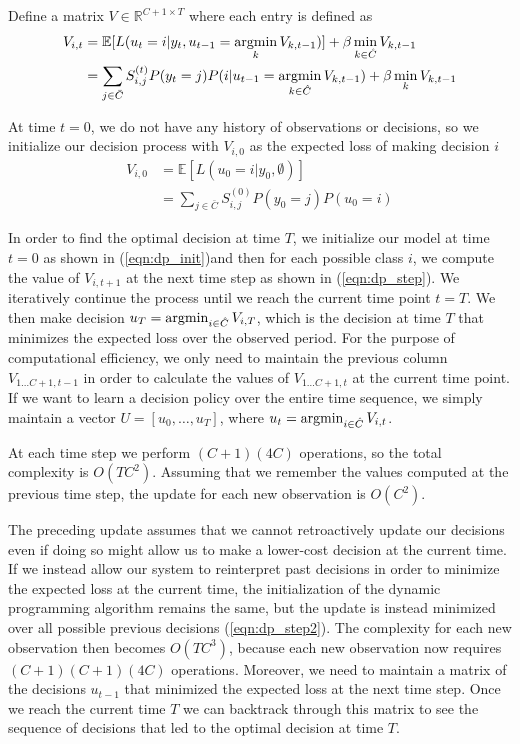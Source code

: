 \documentclass[12pt,solutions]{article}
\newcommand{\argmin}{\operatornamewithlimits{argmin}}
\newcommand{\R}{\mathbb{R}}
\newcommand{\I}{\mathbb{I}}
\newcommand{\E}{\mathbb{E}}
\begin{document}
Define a matrix $V \in \R^{C+1\times T}$ where each entry is defined as
\begin{align}
V_{i,t} &=  \E[L(u_t=i|y_t, u_{t-1}=\argmin_{k} V_{k,t-1})] + \beta \min_{k\in\hat{C}} V_{k,t-1}\\
&= \sum_{j \in \bar{C}} S_{i,j}^{(t)} P(y_t=j)P(i|u_{t-1}=\argmin_{k\in\hat{C}} V_{k,t-1}) + \beta \min_k V_{k,t-1}
 \label{eqn:dp_step}
\end{align}

At time $t=0$, we do not have any history of observations or decisions, so we initialize our decision process with $V_{i,0}$ as the expected loss of making decision $i$
\begin{align}
V_{i,0} &=  \E[L(u_0=i|y_0, \emptyset)] \\
&=  \sum_{j \in \bar{C}} S_{i,j}^{(0)} P(y_0=j)P(u_0=i)\label{eqn:dp_init}
\end{align}


In order to find the optimal decision at time $T$, we initialize our model at time $t=0$ as shown in (\ref{eqn:dp_init})and then for each possible class $i$, we compute the value of $V_{i,t+1}$ at the next time step as shown in (\ref{eqn:dp_step}). We iteratively continue the process until we reach the current time point $t=T$. We then make decision $u_T = \argmin_{i \in \hat{C}} V_{i, T}$, which is the decision at time $T$ that minimizes the expected loss over the observed period. For the purpose of computational efficiency, we only need to maintain the previous column $V_{1\ldots C+1, t-1}$ in order to calculate the values of $V_{1\ldots C+1, t}$ at the current time point. If we want to learn a decision policy over the entire time sequence, we simply maintain a vector $U = [u_0, \ldots, u_T]$, where $u_t =  \argmin_{i \in \hat{C}} V_{i, t}$.

At each time step we perform $(C+1)(4C)$ operations, so the total complexity is $O(TC^2)$. Assuming that we remember the values computed at the previous time step, the update for each new observation is $O(C^2)$.


The preceding update assumes that we cannot retroactively update our decisions even if doing so might allow us to make a lower-cost decision at the current time. If we instead allow our system to reinterpret past decisions in order to minimize the expected loss at the current time, the initialization of the dynamic programming algorithm remains the same, but the update is instead minimized over all possible previous decisions (\ref{eqn:dp_step2}). The complexity for each new observation then becomes $O(TC^3)$, because each new observation now requires $(C+1)(C+1)(4C)$ operations. Moreover, we need to maintain a matrix of the decisions $u_{t-1}$ that minimized the expected loss at the next time step. Once we reach the current time $T$ we can backtrack through this matrix to see the sequence of decisions that led to the optimal decision at time $T$. 
\end{document}
